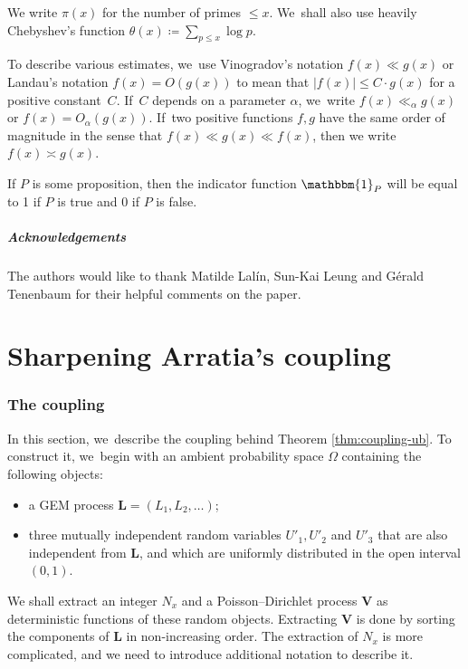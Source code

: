 \documentclass[10pt,a4paper]{amsart}
\newcommand{\bL}{{\boldsymbol L}}
\newcommand{\bV}{{\boldsymbol V}}
\newcommand{\one}{\mathbbm{1}}
\newcommand{\bigoo}[1]{O\!\left(#1 \right)}
\newcommand{\abs}[1]{\left\lvert #1 \right\rvert}
\theoremstyle{plain}
\theoremstyle{definition}
\begin{document}
We write $\pi(x)$ for the number of primes $\le x$. We~shall also use heavily Chebyshev's function $\theta(x) \coloneqq \sum_{p\le x}\log p$.

To describe various estimates, we~use Vinogradov's notation $f(x) \ll g(x)$ or Landau's notation $f(x) = \bigoo{g(x)}$ to mean that $\abs{f(x)} \le C\cdot g(x)$ for a positive constant~$C$. If~$C$ depends on a parameter $\alpha$, we~write $f(x) \ll_\alpha g(x)$ or $f(x) = O_\alpha(g(x))$. If~two positive functions $f, g$ have the same order of magnitude in the sense that $f(x) \ll g(x) \ll f(x)$, then we write $f(x) \asymp g(x)$.

If $P$ is some proposition, then the indicator function $\one _P$ will be equal to 1 if $P$ is true and $0$ if $P$ is false.

\subsubsection*{Acknowledgements}
The authors would like to thank Matilde Lalín, Sun-Kai Leung and Gérald Tenenbaum for their helpful comments on the paper.

\part{Sharpening Arratia's coupling}\label{part:Arratia}

\section{The coupling}
\label{sec:coupling}

In this section, we~describe the coupling behind Theorem \ref{thm:coupling-ub}. To construct it, we~begin with an ambient probability space $\Omega$ containing the following objects:
\begin{itemize}
\item a GEM process $\bL = (L_1, L_2, \ldots)$;

\item three mutually independent random variables $U'_1, U'_2$ and $U'_3$ that are also independent from $\bL$, and which are uniformly distributed in the open interval $(0, 1)$.
\end{itemize}
We shall extract an integer $N_x$ and a Poisson--Dirichlet process $\bV$ as deterministic functions of these random objects. Extracting $\bV$ is done by sorting the components of $\bL$ in non-increasing order. The extraction of $N_x$ is more complicated, and we need to introduce additional notation to describe it.
\end{document}
